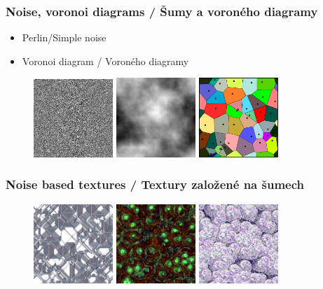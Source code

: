\begin{frame}\frametitle{Noise, voronoi diagrams / Šumy a voroného diagramy}
	\begin{itemize}
		\item Perlin/Simple noise
    \item Voronoi diagram / Voroného diagramy
	\end{itemize}
	\begin{figure}[h]
		\includegraphics[width=3cm,keepaspectratio]{pics/procedural/simple_noise}
		\includegraphics[width=3cm,keepaspectratio]{pics/procedural/midpoint_noise}
		\includegraphics[width=3cm,keepaspectratio]{pics/procedural/voronoid}
	\end{figure}
\end{frame}


\begin{frame}\frametitle{Noise based textures / Textury založené na šumech}
	\begin{figure}[h]
		\includegraphics[width=3cm,keepaspectratio]{pics/procedural/tex00.jpg}
		\includegraphics[width=3cm,keepaspectratio]{pics/procedural/tex01.jpg}
		\includegraphics[width=3cm,keepaspectratio]{pics/procedural/tex02.jpg}
	\end{figure}
\end{frame}

